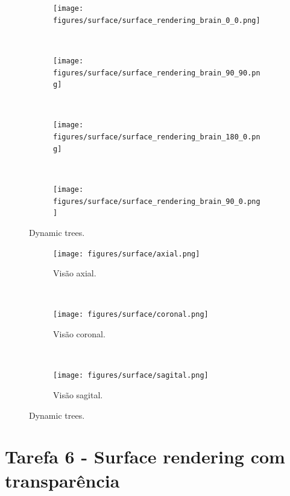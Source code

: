 \documentclass{article}
\begin{document}
\begin{figure}[H]
    \centering
    \begin{subfigure}[b]{0.45\textwidth}
        \texttt{[image: figures/surface/surface\_rendering\_brain\_0\_0.png]}
    \end{subfigure}
    ~
    \begin{subfigure}[b]{0.45\textwidth}
        \texttt{[image: figures/surface/surface\_rendering\_brain\_90\_90.png]}
    \end{subfigure}
    \\
    \begin{subfigure}[b]{0.45\textwidth}
        \texttt{[image: figures/surface/surface\_rendering\_brain\_180\_0.png]}
    \end{subfigure}
    ~
    \begin{subfigure}[b]{0.45\textwidth}
        \texttt{[image: figures/surface/surface\_rendering\_brain\_90\_0.png]}
    \end{subfigure}

    \caption{Dynamic trees.}
    \label{fig:surface}
\end{figure}

\begin{figure}[H]
    \centering
    \begin{subfigure}[b]{0.3\textwidth}
        \texttt{[image: figures/surface/axial.png]}
        \caption{Visão axial.}
    \end{subfigure}
    ~
    \begin{subfigure}[b]{0.3\textwidth}
        \texttt{[image: figures/surface/coronal.png]}
        \caption{Visão coronal.}
    \end{subfigure}
    ~
    \begin{subfigure}[b]{0.3\textwidth}
        \texttt{[image: figures/surface/sagital.png]}
        \caption{Visão sagital.}
    \end{subfigure}

    \caption{Dynamic trees.}
    \label{fig:dynamic}
\end{figure}

\section{Tarefa 6 - Surface rendering com transparência}
\end{document}

